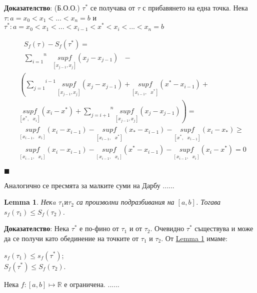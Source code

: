 \documentclass[12pt]{article}
\newtheorem{lemma}{Lemma}
\newcommand{\suma}[2]{\overset{#2}{\underset{#1}{\sum}}}
\newcommand{\spc}{\text{ }}
\begin{document}
	\textbf{Доказателство}: (Б.О.О.) $\tau^{*}$ се получава от $\tau$ с прибавянето на една точка.
	Нека $\tau : a=x_{0}<x_{1}<...<x_{n}=b$ и
	$\tau^{*} : a=x_{0}<x_{1}<...<x_{i-1}<x^{*}<x_{i}<...<x_{n}=b$ 
	\newline
	
	\begin{equation*}
		\begin{aligned}
			&\spc S_{f}\left(\tau\right) - S_{f}\left(\tau^{*}\right) =
			\\
			&\spc\suma{i=1}{n}\spc\underset{\left[x_{j-1}, x_{j}\right]}{sup f} \left(x_{j} - x_{j-1}\right)\spc-
			\\
			&\left(
			\suma{j=1}{i-1}\underset{\left[x_{j-1}, x_{j}\right]}{sup f} \left(x_{j} - x_{j-1}\right) + 
			\underset{\left[x_{i-1},\spc x^{*}\right]}{sup f} \left(x^{*} - x_{i-1}\right) +
			\right. \\ &\left.
			\underset{\left[x^{*},\spc x_{i}\right]}{sup f} \left(x_{i} - x^{*}\right) +
			\suma{j=i+1}{n}\underset{\left[x_{j-1}, x_{j}\right]}{sup f} \left(x_{j} - x_{j-1}\right)
			\right) =
			\\
			&\underset{\left[x_{i-1},\spc x_{i}\right]}{sup f} \left(x_{i} - x_{i-1}\right) - 
			\underset{\left[x_{i-1},\spc x^{*}\right]}{sup f} \left(x_{*} - x_{i-1}\right) -
			\underset{\left[x^{*},\spc x_{i-1}\right]}{sup f} \left(x_{i} - x_{*}\right) \geq
			\\
			&\underset{\left[x_{i-1},\spc x_{i}\right]}{sup f} \left(x_{i} - x_{i-1}\right) - 
			\underset{\left[x_{i-1},\spc x_{i}\right]}{sup f} \left(x^{*} - x_{i-1}\right) -
			\underset{\left[x_{i-1},\spc x_{i}\right]}{sup f} \left(x_{i} - x^{*}\right) = 0 
		\end{aligned}
	\end{equation*}
	\begin{flushright}
		$\blacksquare$
	\end{flushright}
	Аналогично се пресмята за малките суми на Дарбу ......
	
	\begin{lemma}
		Некa $\tau_{1} и \tau_{2}$ са произволни подразбивания на $\left[a, b\right]$.\newline
		Тогава $s_{f}\left(\tau_{1}\right) \leq S_{f}\left(\tau_{2}\right)$.
	\end{lemma}
	\textbf{Доказателство}: Нека $\tau^{*}$ е по-фино от $\tau_{1}$ и от $\tau_{2}$. Очевидно $\tau^{*}$ съществува и може да се получи като обединение на точките от $\tau_{1}$ и $\tau_{2}$. От \underline{Lemma 1} 
	имаме:
	\begin{center}
		$s_{f}\left(\tau_{1}\right) \leq s_{f}\left(\tau^{*}\right)$; \\
		$S_{f}\left(\tau^{*}\right) \leq S_{f}\left(\tau_{2}\right)$.
	\end{center}
	Нека $f: \left[a, b\right] \mapsto \mathbb{R}$ е ограничена.
	......
	
\end{document}
